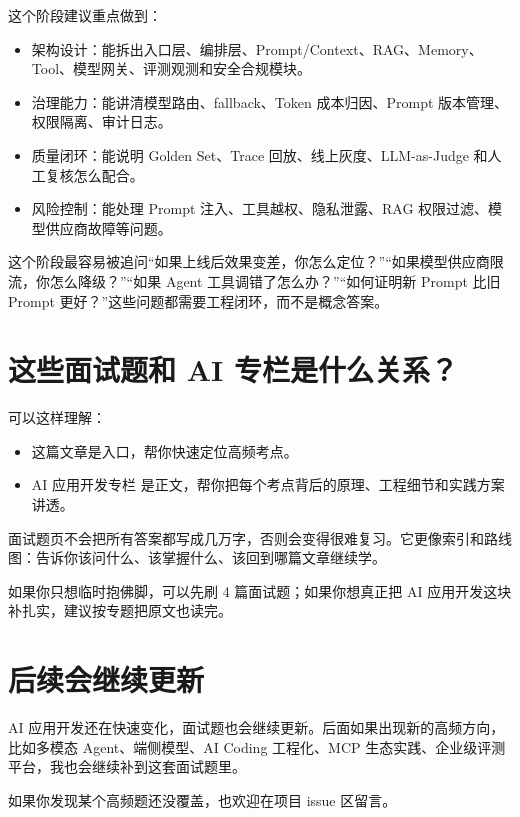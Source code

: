 \documentclass[10pt,a4paper]{ctexart}
\begin{document}
这个阶段建议重点做到：


\begin{itemize}[itemsep=2pt, topsep=4pt]
  \item 架构设计：能拆出入口层、编排层、Prompt/Context、RAG、Memory、Tool、模型网关、评测观测和安全合规模块。
  \item 治理能力：能讲清模型路由、fallback、Token 成本归因、Prompt 版本管理、权限隔离、审计日志。
  \item 质量闭环：能说明 Golden Set、Trace 回放、线上灰度、LLM-as-Judge 和人工复核怎么配合。
  \item 风险控制：能处理 Prompt 注入、工具越权、隐私泄露、RAG 权限过滤、模型供应商故障等问题。
\end{itemize}


这个阶段最容易被追问“如果上线后效果变差，你怎么定位？”“如果模型供应商限流，你怎么降级？”“如果 Agent 工具调错了怎么办？”“如何证明新 Prompt 比旧 Prompt 更好？”这些问题都需要工程闭环，而不是概念答案。



\section{这些面试题和 AI 专栏是什么关系？}


可以这样理解：


\begin{itemize}[itemsep=2pt, topsep=4pt]
  \item 这篇文章是入口，帮你快速定位高频考点。
  \item AI 应用开发专栏 是正文，帮你把每个考点背后的原理、工程细节和实践方案讲透。
\end{itemize}


面试题页不会把所有答案都写成几万字，否则会变得很难复习。它更像索引和路线图：告诉你该问什么、该掌握什么、该回到哪篇文章继续学。



如果你只想临时抱佛脚，可以先刷 4 篇面试题；如果你想真正把 AI 应用开发这块补扎实，建议按专题把原文也读完。



\section{后续会继续更新}


AI 应用开发还在快速变化，面试题也会继续更新。后面如果出现新的高频方向，比如多模态 Agent、端侧模型、AI Coding 工程化、MCP 生态实践、企业级评测平台，我也会继续补到这套面试题里。



如果你发现某个高频题还没覆盖，也欢迎在项目 issue 区留言。
\end{document}
